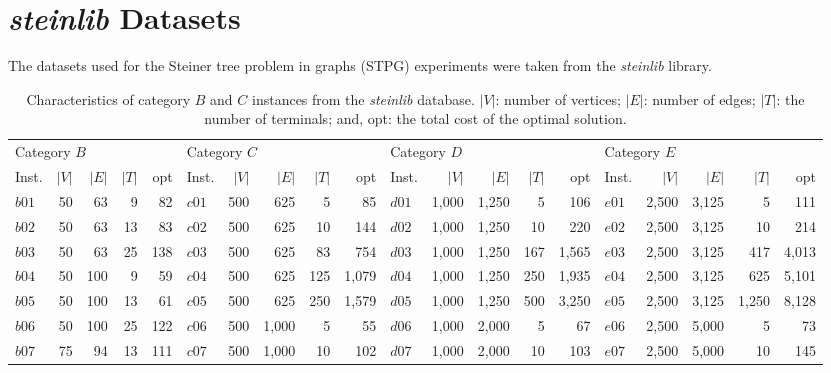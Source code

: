 \documentclass[preprint]{elsarticle}
\begin{document}
\section{\emph{steinlib} Datasets}\label{app:stein_data}
The datasets used for the Steiner tree problem in graphs (STPG) experiments were taken from the \emph{steinlib}\citet{steinlib} library.

\begin{table}[h]
\centering
\caption[Characteristics of category $B$, $C$, $D$ and $E$ instances from the \textit{steinlib} database]{Characteristics of category $B$ and $C$ instances from the \textit{steinlib} database. $|V|$: number of vertices; $|E|$: number of edges; $|T|$: the number of terminals; and,
         opt: the total cost of the optimal solution.}\label{tab:stpgprobs1}
\begin{adjustbox}{width=\textwidth}
\begin{tabular}{lrrrr|lrrrr|lrrrr|lrrrr} \toprule
\multicolumn{5}{l}{Category $B$} & \multicolumn{5}{l}{Category $C$}&\multicolumn{5}{l}{Category $D$} & \multicolumn{5}{l}{Category $E$}\\ 
\cmidrule(lr){1-5} \cmidrule(lr){6-10}\cmidrule(lr){11-15}\cmidrule(lr){16-20}
Inst.&$|V|$&$|E|$&$|T|$&opt& Inst.&$|V|$&$|E|$&$|T|$&opt&Inst.&$|V|$&$|E|$&$|T|$&opt& Inst.&$|V|$&$|E|$&$|T|$&opt\\ \hline
$b01$ & 50 & 63 & 9 & 82 & $c01$ & 500 & 625 & 5 & 85&  $d01$ & 1,000 & 1,250 & 5 & 106 & $e01$ & 2,500 & 3,125 & 5 & 111\\
$b02$ & 50 & 63 & 13 & 83& $c02$ & 500 & 625 & 10 & 144&  $d02$ & 1,000 & 1,250 & 10 & 220 & $e02$ & 2,500 & 3,125 & 10 & 214\\
$b03$ & 50 & 63 & 25 & 138& $c03$ & 500 & 625 & 83 & 754&  $d03$ & 1,000 & 1,250 & 167 & 1,565& $e03$ & 2,500 & 3,125 & 417 & 4,013\\
$b04$ & 50 & 100 & 9 & 59& $c04$ & 500 & 625 & 125 & 1,079&  $d04$ & 1,000 & 1,250 & 250 & 1,935& $e04$ & 2,500 & 3,125 & 625 & 5,101\\
$b05$ & 50 & 100 & 13 & 61& $c05$ & 500 & 625 & 250 & 1,579&  $d05$ & 1,000 & 1,250 & 500 & 3,250& $e05$ & 2,500 & 3,125 & 1,250 & 8,128\\
$b06$ & 50 & 100 & 25 & 122& $c06$ & 500 & 1,000 & 5 & 55&  $d06$ & 1,000 & 2,000 & 5 & 67& $e06$ & 2,500 & 5,000 & 5 & 73\\
$b07$ & 75 & 94 & 13 & 111& $c07$ & 500 & 1,000 & 10 & 102&  $d07$ & 1,000 & 2,000 & 10 & 103& $e07$ & 2,500 & 5,000 & 10 & 145\\

\end{tabular}
\end{adjustbox}
\end{table}
\end{document}
